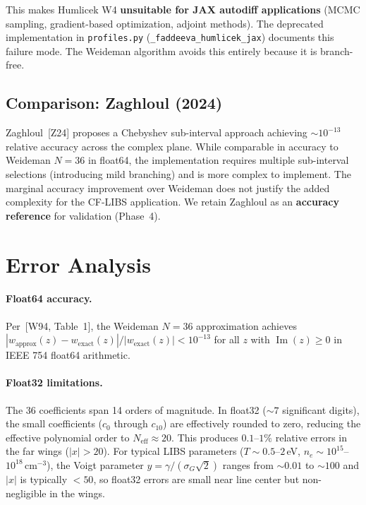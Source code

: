\documentclass[11pt]{article}
\newcommand{\wfn}{w}  %
\newcommand{\im}{\operatorname{Im}}
\begin{document}
This makes Humlicek W4 \textbf{unsuitable for JAX autodiff applications}
(MCMC sampling, gradient-based optimization, adjoint methods). The deprecated
implementation in \texttt{profiles.py} (\texttt{\_faddeeva\_humlicek\_jax}) documents
this failure mode. The Weideman algorithm avoids this entirely because it is branch-free.


\subsection{Comparison: Zaghloul (2024)}
\label{sec:zaghloul}

Zaghloul~[Z24] proposes a Chebyshev sub-interval approach achieving $\sim 10^{-13}$
relative accuracy across the complex plane. While comparable in accuracy to
Weideman $N=36$ in float64, the implementation requires multiple sub-interval
selections (introducing mild branching) and is more complex to implement.
The marginal accuracy improvement over Weideman does not justify the added
complexity for the CF-LIBS application. We retain Zaghloul as an
\textbf{accuracy reference} for validation (Phase~4).


\section{Error Analysis}
\label{sec:error}

\paragraph{Float64 accuracy.}
Per~[W94, Table~1], the Weideman $N=36$ approximation achieves
$|\wfn_{\text{approx}}(z) - \wfn_{\text{exact}}(z)|/|\wfn_{\text{exact}}(z)| < 10^{-13}$
for all $z$ with $\im(z) \geq 0$ in IEEE 754 float64 arithmetic.

\paragraph{Float32 limitations.}
The 36 coefficients span 14 orders of magnitude. In float32
($\sim 7$ significant digits), the small coefficients ($c_0$ through $c_{10}$)
are effectively rounded to zero, reducing the effective polynomial order to
$N_{\text{eff}} \approx 20$. This produces $0.1$--$1\%$ relative errors in the
far wings ($|x| > 20$). For typical LIBS parameters
($T \sim 0.5$--$2$\,eV, $n_e \sim 10^{15}$--$10^{18}$\,cm$^{-3}$),
the Voigt parameter $y = \gamma/(\sigma_G\sqrt{2})$ ranges from $\sim 0.01$ to $\sim 100$
and $|x|$ is typically $< 50$, so float32 errors are small near line center
but non-negligible in the wings.
\end{document}
